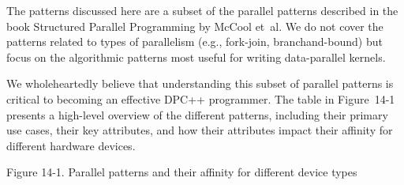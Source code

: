 The patterns discussed here are a subset of the parallel patterns described in the book Structured Parallel Programming by McCool et al. We do not cover the patterns related to types of parallelism (e.g., fork-join, branchand-bound) but focus on the algorithmic patterns most useful for writing data-parallel kernels.\par

We wholeheartedly believe that understanding this subset of parallel patterns is critical to becoming an effective DPC++ programmer. The table in Figure 14-1 presents a high-level overview of the different patterns, including their primary use cases, their key attributes, and how their attributes impact their affinity for different hardware devices.\par

\hspace*{\fill} \par %
Figure 14-1. Parallel patterns and their affinity for different device 
types

